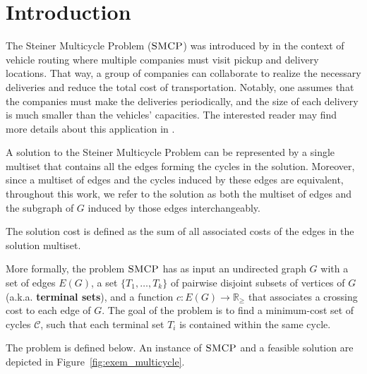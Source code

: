 \chapter{Introduction}
\label{chapter:introduction}

The Steiner Multicycle Problem (\(\textsc{SMCP}\)) was introduced by \cite{Pereira2018TheSM} in the context of vehicle routing where multiple companies must visit pickup and delivery locations. That way, a group of companies can collaborate to realize the necessary deliveries and reduce the total cost of transportation. 
Notably, one assumes that the companies must make the deliveries periodically, and the size of each delivery is much smaller than the vehicles' capacities.
The interested reader may find more details about this application in \cite{Pereira2018TheSM}.


A solution to the Steiner Multicycle Problem can be represented by a single multiset that contains all the edges forming the cycles in the solution. Moreover, since a multiset of edges and the cycles induced by these edges are equivalent, throughout this work, we refer to the solution as both the multiset of edges and the subgraph of \(G\) induced by those edges interchangeably.

The solution cost is defined as the sum of all associated costs of the edges in the solution multiset.

More formally, the problem \(\textsc{SMCP}\) has as input an undirected graph \(G\) with a set of edges $E(G)$, a set \(\{T_1, \dots, T_k\}\) of pairwise disjoint subsets of vertices of \(G\) (a.k.a. \textbf{terminal sets}), and a function $c \colon E(G) \to \mathbb{R}_\ge$ that associates a crossing cost to each edge of \(G\). The goal of the problem is to find a minimum-cost set of cycles \(\mathcal{C}\), such that each terminal set \(T_i\) is contained within the same cycle.

The problem is defined below. An instance of \(\textsc{SMCP}\) and a feasible solution are depicted in Figure~\ref{fig:exem_multicycle}.

\medskip
\noindent {}
\medskip

